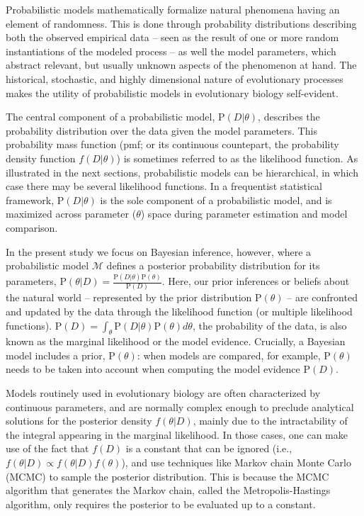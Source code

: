 \documentclass[oneside]{article}
\begin{document}
Probabilistic models mathematically formalize natural phenomena
having an element of randomness.
This is done through probability distributions describing both the observed
empirical data -- seen as the result of one or more random
instantiations of the modeled process -- as well the model parameters,
which abstract relevant, but usually unknown aspects
of the phenomenon at hand.
The historical, stochastic, and highly dimensional nature of evolutionary
processes makes the utility of probabilistic models in evolutionary
biology self-evident. 

The central component of a probabilistic model, $\text{P}(D|\theta)$,
describes the probability distribution over the data given the model
parameters.
This probability mass function (pmf; or its continuous
countepart, the probability density function $f(D|\theta)$) is sometimes
referred to as the likelihood function.
As illustrated in the next sections, probabilistic models can be
hierarchical, in which case there may be several likelihood functions.
In a frequentist statistical framework, $\text{P}(D|\theta)$ is the sole
component of a probabilistic model, and is maximized across parameter ($\theta$) space during parameter estimation and model comparison.

In the present study we focus on Bayesian inference, however, 
where a probabilistic model $\mathcal{M}$ defines a posterior probability
distribution for its parameters, $\text{P}(\theta|D) =
\frac{\text{P}(D|\theta)\text{P}(\theta)}{\text{P}(D)}$.
Here, our prior inferences or beliefs about the natural world -- represented by
the prior distribution $\text{P}(\theta)$ -- are confronted and updated by
the data through the likelihood function (or multiple likelihood functions).
$\text{P}(D) = \int_\theta \text{P}(D|\theta)\text{P}(\theta)d\theta$, the
probability of the data, is also known as the marginal likelihood or the model
evidence.
Crucially, a Bayesian model includes a prior, $\text{P}(\theta)$:
when models are compared, for example, $\text{P}(\theta)$ needs to be taken
into account when computing the model evidence $\text{P}(D)$.

Models routinely used in evolutionary biology are often characterized by
continuous parameters, and are normally complex enough to preclude
analytical solutions for the posterior density $f(\theta|D)$, mainly
due to the intractability of the integral appearing in the marginal
likelihood.
In those cases, one can make use of the fact that $f(D)$
is a constant that can be ignored (i.e., $f(\theta|D)
\propto f(\theta|D)f(\theta)$), and use 
techniques like Markov chain Monte Carlo (MCMC) to sample the posterior
distribution.
This is because the MCMC algorithm that generates the Markov chain,
called the Metropolis-Hastings \citep{metropolis53,mh} algorithm, only requires the
posterior to be evaluated up to a constant.
\end{document}
